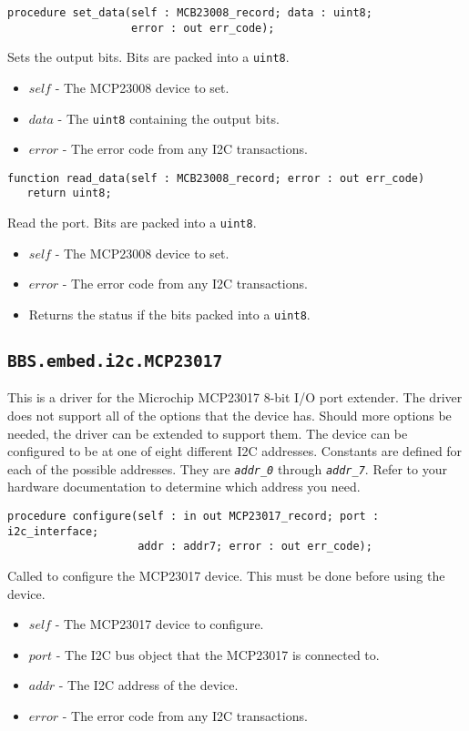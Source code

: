 \documentclass[10pt, openany]{book}
\newcommand{\indexfunc}[1]{\index[func]{#1}}
\newcommand{\package}[1]{\texttt{#1}}
\newcommand{\constant}[1]{\emph{\texttt{#1}}}
\newcommand{\datatype}[1]{\texttt{#1}}
\begin{document}
\begin{lstlisting}
procedure set_data(self : MCB23008_record; data : uint8;
                   error : out err_code);
\end{lstlisting}
\indexfunc{set\_data}
Sets the output bits.  Bits are packed into a \datatype{uint8}.
\begin{itemize}
  \item $self$ - The MCP23008 device to set.
  \item $data$ - The \datatype{uint8} containing the output bits.
  \item $error$ - The error code from any I2C transactions.
\end{itemize}

\begin{lstlisting}
function read_data(self : MCB23008_record; error : out err_code)
   return uint8;
\end{lstlisting}
\indexfunc{read\_data}
Read the port.  Bits are packed into a \datatype{uint8}.
\begin{itemize}
  \item $self$ - The MCP23008 device to set.
  \item $error$ - The error code from any I2C transactions.
  \item Returns the status if the bits packed into a \datatype{uint8}.
\end{itemize}

\subsection{\package{BBS.embed.i2c.MCP23017}}
This is a driver for the Microchip MCP23017 8-bit I/O port extender\cite{MCP23017}.  The driver does not support all of the options that the device has.  Should more options be needed, the driver can be extended to support them.  The device can be configured to be at one of eight different I2C addresses.  Constants are defined for each of the possible addresses.  They are \constant{addr\_0} through \constant{addr\_7}.  Refer to your hardware documentation to determine which address you need.

\begin{lstlisting}
procedure configure(self : in out MCP23017_record; port : i2c_interface;
                    addr : addr7; error : out err_code);
\end{lstlisting}
\indexfunc{configure}
Called to configure the MCP23017 device.  This must be done before using the device.
\begin{itemize}
  \item $self$ - The MCP23017 device to configure.
  \item $port$ - The I2C bus object that the MCP23017 is connected to.
  \item $addr$ - The I2C address of the device.
  \item $error$ - The error code from any I2C transactions.
\end{itemize}
\end{document}
